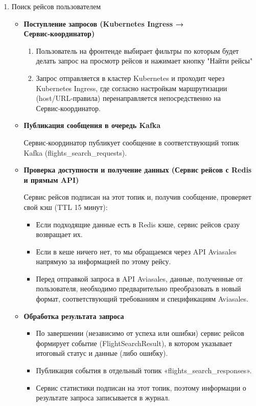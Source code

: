 \begin{enumerate}

    \item Поиск рейсов пользователем
    \begin{itemize}
        \item \textbf{Поступление запросов (Kubernetes Ingress → Сервис‑координатор)}
        \begin{enumerate}
            \item Пользователь на фронтенде выбирает фильтры по которым будет делать запрос на просмотр рейсов и нажимает кнопку "Найти рейсы"
            \item Запрос отправляется в кластер Kubernetes и проходит через Kubernetes Ingress, где согласно настройкам маршрутизации (host/URL‑правила) перенаправляется непосредственно на Сервис‑координатор.
        \end{enumerate}
        \item \textbf{Публикация сообщения в очередь Kafka}

        Сервис‑координатор публикует сообщение в соответствующий топик Kafka (flights\_search\_requests).
        \item \textbf{Проверка доступности и получение данных (Сервис рейсов с Redis и прямым API)}

        Сервис рейсов подписан на этот топик и, получив сообщение, проверяет свой кэш (TTL 15 минут):
        \begin{itemize}
            \item Если подходящие данные есть в Redis кэше, сервис рейсов сразу возвращает их.
            \item Если в кеше ничего нет, то мы обращаемся через API Aviasales напрямую за информацией по этому рейсу.
            \item Перед отправкой запроса в API Aviasales, данные, полученные от пользователя, необходимо предварительно преобразовать в новый формат, соответствующий требованиям и спецификациям Aviasales.
        \end{itemize}

        \item \textbf{Обработка результата запроса}
        \begin{itemize}
            \item По завершении (независимо от успеха или ошибки) сервис рейсов формирует событие (FlightSearchResult), в котором указывает итоговый статус и данные (либо ошибку).
            \item Публикация события в отдельный топик «flights\_search\_responses».
            \item Сервис статистики подписан на этот топик, поэтому информации о результате запроса записывается в журнал.
        \end{itemize}


\end{itemize}
\end{enumerate}
